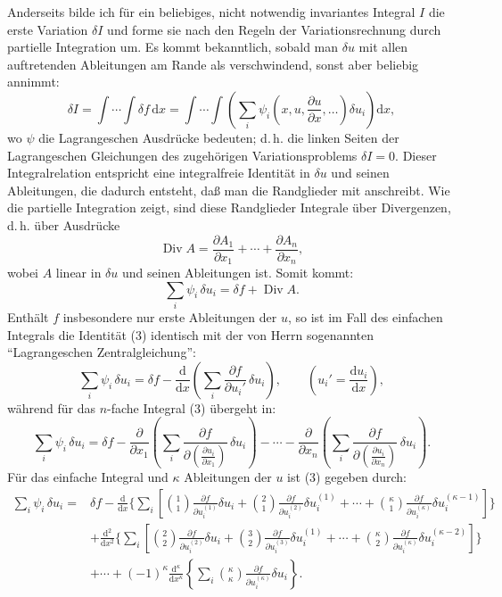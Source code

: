 \documentclass[11pt]{article}
\newcommand{\dd}{\mathrm d}
\newcommand{\Div}{\operatorname{Div}}
\newcommand{\p}{\partial}
\begin{document}
Anderseits bilde ich für ein beliebiges, nicht notwendig invariantes Integral \(I\) die erste Variation \(\delta I\) und forme sie nach den Regeln der Variationsrechnung durch partielle Integration um. Es kommt bekanntlich, sobald man \(\delta u\) mit allen auftretenden Ableitungen am Rande als verschwindend, sonst aber beliebig annimmt:
\begin{equation}
\delta I=\int\!\cdots\!\int \delta f\,\dd x
=\int\!\cdots\!\int\left(\sum_i\psi_i\!\left(x,u,\frac{\p u}{\p x},\ldots\right)\delta u_i\right)\dd x,
\tag{2}
\end{equation}
wo \(\psi\) die Lagrangeschen Ausdrücke bedeuten; d.\,h. die linken Seiten der Lagrangeschen Gleichungen des zugehörigen Variationsproblems \(\delta I=0\). Dieser Integralrelation entspricht eine integralfreie Identität in \(\delta u\) und seinen Ableitungen, die dadurch entsteht, daß man die Randglieder mit anschreibt. Wie die partielle Integration zeigt, sind diese Randglieder Integrale über Divergenzen, d.\,h. über Ausdrücke
\[
\Div A=\frac{\p A_1}{\p x_1}+\cdots+\frac{\p A_n}{\p x_n},
\]
wobei \(A\) linear in \(\delta u\) und seinen Ableitungen ist. Somit kommt:
\begin{equation}
\sum_i\psi_i\,\delta u_i=\delta f+\Div A.
\tag{3}
\end{equation}
Enthält \(f\) insbesondere nur erste Ableitungen der \(u\), so ist im Fall des einfachen Integrals die Identität (3) identisch mit der von Herrn sogenannten ``Lagrangeschen Zentralgleichung'':
\begin{equation}
\sum_i \psi_i\,\delta u_i
=\delta f-\frac{\dd}{\dd x}\left(\sum_i\frac{\p f}{\p u_i'}\,\delta u_i\right),
\qquad \left(u_i'=\frac{\dd u_i}{\dd x}\right),
\tag{4}
\end{equation}
während für das \(n\)-fache Integral (3) übergeht in:
\begin{equation}
\sum_i\psi_i\,\delta u_i
=
\delta f
-\frac{\p}{\p x_1}\left(\sum_i\frac{\p f}{\p \left(\frac{\p u_i}{\p x_1}\right)}\,\delta u_i\right)
-\cdots
-\frac{\p}{\p x_n}\left(\sum_i\frac{\p f}{\p \left(\frac{\p u_i}{\p x_n}\right)}\,\delta u_i\right).
\tag{5}
\end{equation}
Für das einfache Integral und \(\kappa\) Ableitungen der \(u\) ist (3) gegeben durch:
\begin{equation}
\begin{aligned}
\sum_i\psi_i\,\delta u_i
={}&\delta f
-\frac{\dd}{\dd x}\Bigg\{\sum_i\left[
\binom{1}{1}\frac{\p f}{\p u_i^{(1)}}\delta u_i
+\binom{2}{1}\frac{\p f}{\p u_i^{(2)}}\delta u_i^{(1)}
+\cdots+
\binom{\kappa}{1}\frac{\p f}{\p u_i^{(\kappa)}}\delta u_i^{(\kappa-1)}
\right]\Bigg\}\\
&+\frac{\dd^2}{\dd x^2}\Bigg\{\sum_i\left[
\binom{2}{2}\frac{\p f}{\p u_i^{(2)}}\delta u_i
+\binom{3}{2}\frac{\p f}{\p u_i^{(3)}}\delta u_i^{(1)}
+\cdots+
\binom{\kappa}{2}\frac{\p f}{\p u_i^{(\kappa)}}\delta u_i^{(\kappa-2)}
\right]\Bigg\}\\
&+\cdots
+(-1)^\kappa\frac{\dd^\kappa}{\dd x^\kappa}
\left\{\sum_i\binom{\kappa}{\kappa}
\frac{\p f}{\p u_i^{(\kappa)}}\delta u_i\right\}.
\end{aligned}
\tag{6}
\end{equation}
\end{document}
